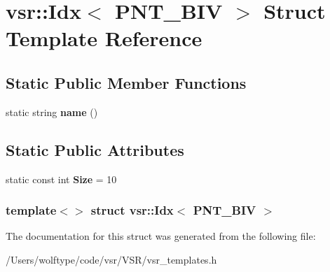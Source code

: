 \hypertarget{structvsr_1_1_idx_3_01_p_n_t___b_i_v_01_4}{\section{vsr\-:\-:Idx$<$ P\-N\-T\-\_\-\-B\-I\-V $>$ Struct Template Reference}
\label{structvsr_1_1_idx_3_01_p_n_t___b_i_v_01_4}
}
\subsection*{Static Public Member Functions}
\begin{DoxyCompactItemize}
\item 
\hypertarget{structvsr_1_1_idx_3_01_p_n_t___b_i_v_01_4_ad92ac72119790a2d6e949764b43f99c8}{static string {\bfseries name} ()}\label{structvsr_1_1_idx_3_01_p_n_t___b_i_v_01_4_ad92ac72119790a2d6e949764b43f99c8}

\end{DoxyCompactItemize}
\subsection*{Static Public Attributes}
\begin{DoxyCompactItemize}
\item 
\hypertarget{structvsr_1_1_idx_3_01_p_n_t___b_i_v_01_4_a96ed18ddadbb2a00362b7beb5d78f366}{static const int {\bfseries Size} = 10}\label{structvsr_1_1_idx_3_01_p_n_t___b_i_v_01_4_a96ed18ddadbb2a00362b7beb5d78f366}

\end{DoxyCompactItemize}
\subsubsection*{template$<$$>$ struct vsr\-::\-Idx$<$ P\-N\-T\-\_\-\-B\-I\-V $>$}



The documentation for this struct was generated from the following file\-:\begin{DoxyCompactItemize}
\item 
/\-Users/wolftype/code/vsr/\-V\-S\-R/vsr\-\_\-templates.\-h\end{DoxyCompactItemize}
